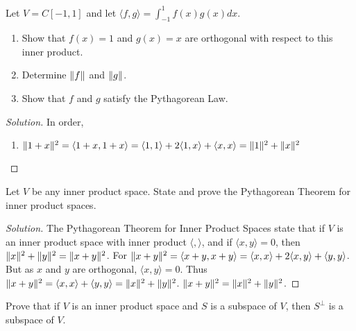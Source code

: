     \begin{problem}
    Let $V = C[-1,1]$ and let $\langle f,g\rangle = \int_{-1}^{1} f(x)g(x)dx$.
    \begin{enumerate}
        \item Show that $f(x)=1$ and $g(x) = x$ are orthogonal with respect to this inner product.
        \item Determine $\lVert f\rVert$ and $\lVert g\rVert$.
        \item Show that $f$ and $g$ satisfy the Pythagorean Law.
    \end{enumerate}
    \end{problem}
    \begin{proof}[Solution]
    In order,
    \begin{enumerate}
        \item $\lVert1+x\rVert^2 = \langle 1+x,1+x\rangle = \langle 1,1\rangle + 2\langle 1,x \rangle + \langle x,x\rangle = \lVert1\rVert^2 + \lVert x\rVert^2$
    \end{enumerate}
    \end{proof}
    \begin{problem}
    Let $V$ be any inner product space. State and prove the Pythagorean Theorem for inner product spaces.
    \end{problem}
    \begin{proof}[Solution]
    The Pythagorean Theorem for Inner Product Spaces state that if $V$ is an inner product space with inner product $\langle, \rangle$, and if $\langle x,y\rangle = 0$, then $\lVert x\rVert^2+\lVert y\rVert^2 = \lVert x+y\rVert^2$. For $\lVert x+y\rVert^2 = \langle x+y,x+y\rangle = \langle x,x\rangle + 2\langle x,y\rangle +\langle y,y\rangle$. But as $x$ and $y$ are orthogonal, $\langle x,y \rangle = 0$. Thus $\lVert x+y\rVert^2 = \langle x,x\rangle + \langle y,y\rangle = \lVert x\rVert^2+\lVert y\rVert^2$. $\lVert x+y\rVert^2 =\lVert x\rVert^2+\lVert y\rVert^2$.
    \end{proof}
    \begin{problem}
    Prove that if $V$ is an inner product space and $S$ is a subspace of $V$, then $S^{\perp}$ is a subspace of $V$.
    \end{problem}
